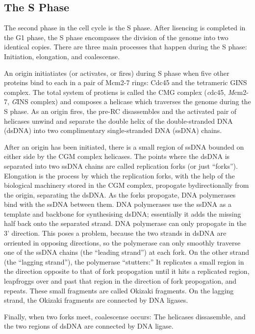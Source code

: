 		\subsection{The S Phase}
		
		The second phase in the cell cycle is the S phase.
		After lisencing is completed in the G1 phase, the S phase encompases the division of the genome into two identical copies.
		There are three main processes that happen during the S phase:
		Initiation, elongation, and coalescense.
		
		An origin initiatiates (or activates, or fires) during S phase when five other proteins bind to each in a pair of Mcm2-7 rings:
		Cdc45 and the tetrameric GINS complex.
		The total system of protiens is called the CMG complex (\emph{c}dc45, \emph{M}cm2-7, \emph{G}INS complex) and composes a helicase which traverses the genome during the S phase.
		As an origin fires, the pre-RC disassembles and the activated pair of helicases unwind and separate the double helix of the double-stranded DNA (dsDNA) into two complimentary single-stranded DNA (ssDNA) chains. \cite{GINSComplex}
		
		After an origin has been initiated, there is a small region of ssDNA bounded on either side by the CGM complex helicases.
		The points where the dsDNA is separated into two ssDNA chains are called replication forks (or just ``forks'').
		Elongation is the process by which the replication forks, with the help of the biological machinery stored in the CGM complex, propogate bydirectionally from the origin, separating the dsDNA.
		As the forks propogate, DNA polymerases bind with the ssDNA between them.
		DNA polymerases use the ssDNA as a template and backbone for synthesising dsDNA; essentially it adds the missing half back onto the separated strand.
		DNA polymerase can only propogate in the 3' direction.
		This poses a problem, because the two strands in dsDNA are orriented in opposing directions, so the polymerase can only smoothly traverse one of the ssDNA chains (the ``leading strand'') at each fork.
		On the other strand (the ``lagging strand''), the polymerase ``stutters:''
		It replicates a small region in the direction opposite to that of fork propogation until it hits a replicated region, leapfroggs over and past that region in the direction of fork propogation, and repeats.
		These small fragments are called Okizaki fragments.
		On the lagging strand, the Okizaki fragments are connected by DNA ligases.
		
		Finally, when two forks meet, coalescense occurs:
		The helicases dissasemble, and the two regions of dsDNA are connected by DNA ligase. \cite{MolecularCellBiology}
		
